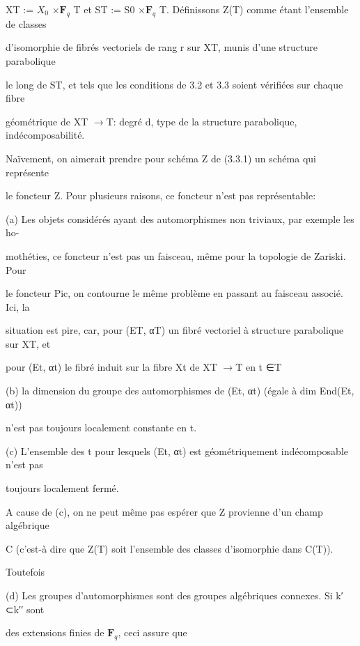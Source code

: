 \documentclass[11pt]{article}
\begin{document}
\noindent XT := \(X_0\) ×\(\mathbf F_q\) T et ST := S0 ×\(\mathbf F_q\) T. Définissons Z(T) comme étant l’ensemble de classes\par
\noindent d’isomorphie de fibrés vectoriels de rang r sur XT, munis d’une structure parabolique\par
\noindent le long de ST, et tels que les conditions de 3.2 et 3.3 soient vérifiées sur chaque fibre\par
\noindent géométrique de XT \(\to\)T: degré d, type de la structure parabolique, indécomposabilité.\par
\noindent Naïvement, on aimerait prendre pour schéma Z de (3.3.1) un schéma qui représente\par
\noindent le foncteur Z. Pour plusieurs raisons, ce foncteur n’est pas représentable:\par
\noindent (a) Les objets considérés ayant des automorphismes non triviaux, par exemple les ho-\par
\noindent mothéties, ce foncteur n’est pas un faisceau, même pour la topologie de Zariski. Pour\par
\noindent le foncteur Pic, on contourne le même problème en passant au faisceau associé. Ici, la\par
\noindent situation est pire, car, pour (ET, αT) un fibré vectoriel à structure parabolique sur XT, et\par
\noindent pour (Et, αt) le fibré induit sur la fibre Xt de XT \(\to\)T en t ∈T\par
\noindent (b) la dimension du groupe des automorphismes de (Et, αt) (égale à dim End(Et, αt))\par
\noindent n’est pas toujours localement constante en t.\par
\noindent (c) L’ensemble des t pour lesquels (Et, αt) est géométriquement indécomposable n’est pas\par
\noindent toujours localement fermé.\par
\noindent A cause de (c), on ne peut même pas espérer que Z provienne d’un champ algébrique\par
\noindent C (c’est-à dire que Z(T) soit l’ensemble des classes d’isomorphie dans C(T)).\par
\noindent Toutefois\par
\noindent (d) Les groupes d’automorphismes sont des groupes algébriques connexes. Si k′ ⊂k′′ sont\par
\noindent des extensions finies de \(\mathbf F_q\), ceci assure que\par
\end{document}
